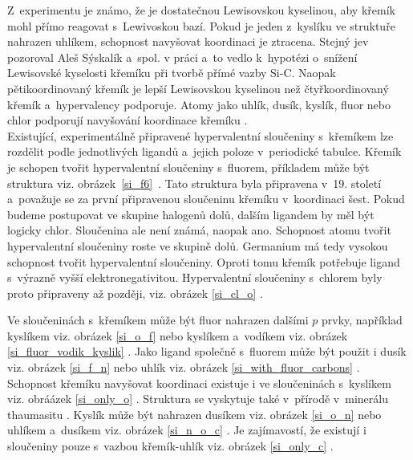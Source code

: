 \documentclass[
digital, %
table,   %
lof,     %
lot,     %
oneside,
]{fithesis3}
\begin{document}
Z~experimentu je známo, že  je dostatečnou Lewisovskou kyselinou, aby křemík mohl přímo reagovat s~Lewivoskou bazí. Pokud je jeden z~kyslíku ve struktuře nahrazen uhlíkem, schopnost navyšovat koordinaci je ztracena. Stejný jev pozoroval Aleš Sýskalík a~spol. v práci \cite{Styskalik2015thesis} a~to vedlo k~hypotézi o~snížení Lewisovské kyselosti křemíku při tvorbě přímé vazby Si-C. Naopak pětikoordinovaný křemík je lepší Lewisovskou kyselinou než čtyřkoordinovaný křemík a~hypervalency podporuje. Atomy jako uhlík, dusík, kyslík, fluor nebo chlor podporují navyšování koordinace křemíku \cite{Wagler2014}.\\

Existující, experimentálně připravené hypervalentní sloučeniny s~křemíkem lze rozdělit podle jednotlivých ligandů a~jejich poloze v~periodické tabulce. Křemík je schopen tvořit hypervalentní sloučeniny s~fluorem, příkladem může být struktura   viz. obrázek~\ref{si_f6}~\cite{memoriesphysiquelussac}. Tato struktura byla připravena v~19. století a~považuje se za první připravenou sloučeninu křemíku v~koordinaci šest. Pokud budeme postupovat ve skupine halogenů dolů, dalším ligandem by měl být logicky chlor. Sloučenina  ale není známá, naopak  ano. Schopnost atomu tvořit hypervalentní sloučeniny roste ve skupině dolů. Germanium má tedy vysokou schopnost tvořit hypervalentní sloučeniny. Oproti tomu křemík potřebuje ligand s~výrazně vyšší elektronegativitou. Hypervalentní sloučeniny s~chlorem byly proto připraveny až později, viz. obrázek \ref{si_cl_o} \cite{LAZAREV199716}.

Ve sloučeninách s~křemíkem může být fluor nahrazen dalšími $p$ prvky, například kyslíkem viz. obrázek \ref{si_o_f} \cite{C0DT01115K} nebo kyslíkem a~vodíkem viz. obrázek \ref{si_fluor_vodik_kyslik} \cite{BOYER19812165}.
Jako ligand společně s~fluorem může být použit i dusík viz. obrázek \ref{si_f_n} \cite{C0DT01115K} nebo uhlík viz. obrázek \ref{si_with_fluor_carbons} \cite{kremikfluorcarbon}. Schopnost křemíku navyšovat koordinaci existuje i ve sloučeninách s~kyslíkem viz. obráázek \ref{si_only_o} \cite{flyn1969}.  Struktura  se vyskytuje také v~přírodě v~minerálu thaumasitu \cite{Edge:a08100}. Kyslík může být nahrazen dusíkem  viz. obrázek \ref{si_o_n} \cite{Wagler2014} nebo uhlíkem a~dusíkem viz. obrázek \ref{si_n_o_c} \cite{Wagler2014}. Je zajímavostí, že existují i sloučeniny pouze s~vazbou křemík-uhlík viz. obrázek \ref{si_only_c} \cite{A901953G} \cite{Wagler2014}.
\end{document}
